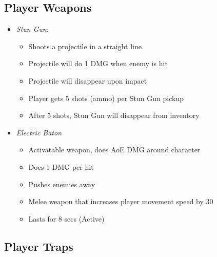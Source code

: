\documentclass[14pt]{report}
\begin{document}
\subsection{Player Weapons}

\begin{itemize}
    \item \emph{Stun Gun}:
    \begin{itemize}
        \item Shoots a projectile in a straight line.
        \item Projectile will do 1 DMG when enemy is hit 
        \item Projectile will disappear upon impact
        \item Player gets 5 shots (ammo) per Stun Gun pickup
        \item After 5 shots, Stun Gun will disappear from inventory
    \end{itemize}
    \item \emph{Electric Baton}
    \begin{itemize}
        \item Activatable weapon, does AoE DMG around character
        \item Does 1 DMG per hit
        \item Pushes enemies away
        \item Melee weapon that increases player movement speed by 30%
        \item Lasts for 8 secs (Active)
    \end{itemize}
\end{itemize}

\subsection{Player Traps}
\end{document}
